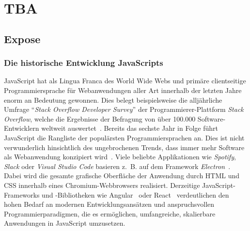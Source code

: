 \chapter{TBA}

\section{Expose}

\subsection{Die historische Entwicklung JavaScripts}

JavaScript hat als Lingua Franca des World Wide Webs und primäre clientseitige Programmiersprache für Webanwendungen aller Art innerhalb der letzten Jahre enorm an Bedeutung gewonnen. Dies belegt beispielsweise die alljährliche Umfrage \enquote{\emph{Stack Overflow Developer Survey}} der Programmierer-Plattform \emph{Stack Overflow}, welche die Ergebnisse der Befragung von über 100.000 Software-Entwicklern weltweit auswertet~\autocite{stackoverflow:survey:2018}. Bereits das sechste Jahr in Folge führt JavaScript die Rangliste der populärsten Programmiersprachen an. Dies ist nicht verwunderlich hinsichtlich des ungebrochenen Trends, dass immer mehr Software als Webanwendung konzipiert wird~\autocite{taivalsaari:2017}\autocite{casteleyn:2014:ria}. Viele beliebte Applikationen wie \emph{Spotify}, \emph{Slack} oder \emph{Visual Studio Code} basieren z.~B. auf dem Framework \emph{Electron}~\autocite{electron}. Dabei wird die gesamte grafische Oberfläche der Anwendung durch HTML und CSS innerhalb eines Chromium-Webbrowsers realisiert. Derzeitige JavaScript-Frameworks und -Bibliotheken wie Angular~\autocite{angular} oder React~\autocite{react} verdeutlichen den hohen Bedarf an modernen Entwicklungsansätzen und anspruchsvollen Programmierparadigmen, die es ermöglichen, umfangreiche, skalierbare Anwendungen in JavaScript umzusetzen.

